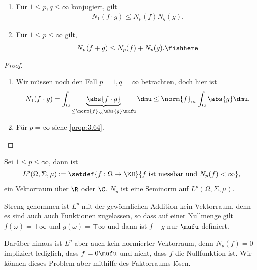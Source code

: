\begin{cor}
\label{prop:3.67}
\begin{enumerate}[label=\arabic{*}.)]
  \item Für $1\le p,q\le \infty$ konjugiert, gilt
\begin{align*}
N_1(f\cdot g) \le N_p(f)N_q(g).
\end{align*}
  \item Für $1\le p\le\infty$ gilt, 
\begin{align*}
N_p(f+g) \le N_p(f) + N_p(g).\fishhere
\end{align*}
\end{enumerate}
\end{cor}

\begin{proof}
\begin{enumerate}[label=\arabic{*}.)]
  \item Wir müssen noch den Fall $p=1, q=\infty$ betrachten, doch hier ist
\begin{align*}
N_1(f\cdot g) = \int_\Omega \underbrace{\abs{f\cdot g}}_{\le\norm{f}_\infty
\abs{g}\mufu}\dmu \le \norm{f}_\infty \int_\Omega \abs{g}\dmu.
\end{align*}
\item Für $p=\infty$ siehe \ref{prop:3.64}.\qedhere
\end{enumerate}
\end{proof}

\begin{cor}
\label{prop:3.68}
Sei $1\le p\le \infty$, dann ist
\begin{align*}
L^p(\Omega,\Sigma,\mu) := \setdef{f:\Omega\to\KH}{f\text{ ist messbar und
}N_p(f)<\infty},
\end{align*}
ein Vektorraum über $\R$ oder $\C$. $N_p$ ist eine Seminorm auf
$L^p(\Omega,\Sigma,\mu)$.\fishhere
\end{cor}

Streng genommen ist $L^p$ mit der gewöhnlichen Addition kein Vektorraum, denn
es sind auch auch Funktionen zugelassen, so dass auf einer Nullmenge gilt
$f(\omega) = \pm \infty$ und $g(\omega)=\mp\infty$ und dann ist $f+g$ nur
$\mufu$ definiert.

Darüber hinaus ist $L^p$ aber auch kein normierter Vektorraum, denn $N_p(f)
= 0$ impliziert lediglich, dass $f=0\mufu$ und nicht, dass $f$ die Nullfunktion ist. Wir können
dieses Problem aber mithilfe des Faktorraums lösen.

